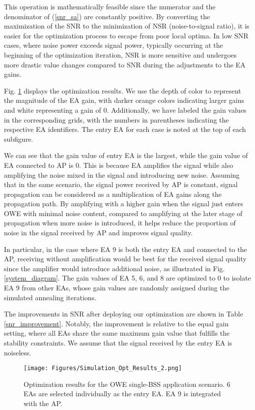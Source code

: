 This operation is mathematically feasible since the numerator and the denominator of (\ref{snr_sa}) are constantly positive. By converting the maximization of the SNR to the minimization of NSR (noise-to-signal ratio), it is easier for the optimization process to escape from poor local optima. In low SNR cases, where noise power exceeds signal power, typically occurring at the beginning of the optimization iteration, NSR is more sensitive and undergoes more drastic value changes compared to SNR during the adjustments to the EA gains.
\par
Fig. \ref{SISO_simulation_res} displays the optimization results.
We use the depth of color to represent the magnitude of the EA gain, with darker orange colors indicating larger gains and white representing a gain of 0. Additionally, we have labeled the gain values in the corresponding grids, with the numbers in parentheses indicating the respective EA identifiers. The entry EA for each case is noted at the top of each subfigure.
\par
We can see that the gain value of entry EA is the largest, while the gain value of EA connected to AP is 0. This is because EA amplifies the signal while also amplifying the noise mixed in the signal and introducing new noise. Assuming that in the same scenario, the signal power received by AP is constant, signal propagation can be considered as a multiplication of EA gains along the propagation path. By amplifying with a higher gain when the signal just enters OWE with minimal noise content, compared to amplifying at the later stage of propagation when more noise is introduced, it helps reduce the proportion of noise in the signal received by AP and improves signal quality.
\par
In particular, in the case where EA 9 is both the entry EA and connected to the AP, receiving without amplification would be best for the received signal quality since the amplifier would introduce additional noise, as illustrated in Fig. \ref{system_diagram}. The gain values of EA 5, 6, and 8 are optimized to 0 to isolate EA 9 from other EAs, whose gain values are randomly assigned during the simulated annealing iterations.
\par
The improvements in SNR after deploying our optimization are shown in Table \ref{snr_improvement}. Notably, the improvement is relative to the equal gain setting, where all EAs share the same maximum gain value that fulfills the stability constraints. We assume that the signal received by the entry EA is noiseless.
\begin{figure}[htbp]
\centering
\texttt{[image: Figures/Simulation\_Opt\_Results\_2.png]}
\caption{Optimization results for the OWE single-BSS application scenario. 6 EAs are selected individually as the entry EA. EA 9 is integrated with the AP.}
\label{SISO_simulation_res}
\vspace{-0.5cm}
\end{figure}

